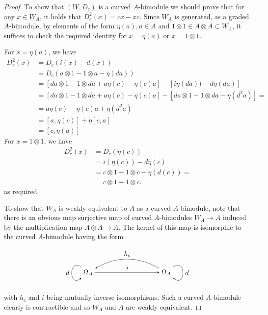 \documentclass[a4paper]{amsart}
\theoremstyle{plain}
\theoremstyle{definition}
\theoremstyle{remark}
\numberwithin{equation}{section}
\theoremstyle{plain}
\begin{document}
\begin{proof}
	To show that $(W,D_c)$ is a curved $A$-bimodule we should prove that for any $x\in W_A$, it holds that $D^2_c(x)=cx-xc$. Since $W_A$ is generated, as a graded $A$-bimodule, by elements of the form $\eta(a), a\in A$ and $1\otimes 1\in A\otimes A\subset W_A$, it suffices to check the required identity for $x=\eta(a)$ or $x=1\otimes 1$.
	
	For $x=\eta(a)$, we have
	\begin{align*}
		D^2_c(x)&=D_c(i(x)-d(x))\\&=D_c(a\otimes 1-1\otimes a-\eta(da))\\
		&=[da\otimes 1-1\otimes da+a\eta(c)-\eta(c)a]-[i\eta(da))-d\eta(da)]\\
		&=[da\otimes 1-1\otimes da+a\eta(c)-\eta(c)a]-[da\otimes 1-1\otimes da-\eta(d^2a)]=\\
		&=a\eta(c)-\eta(c)a+\eta(d^2a)\\
		&=[a,\eta(c)]+\eta[c,a]\\
		&=[c,\eta(a)]
	\end{align*}
	For $x=1\otimes 1$, we have
	\begin{align*}
		D^2_c(x)&=D_c(\eta(c))\\
		&=i(\eta(c))-d\eta(c)\\
		&=c\otimes 1-1\otimes c-\eta(d(c))=\\
		&=c\otimes 1-1\otimes c.
	\end{align*}
	as required.
	
	To show that $W_A$ is weakly equivalent to $A$ as a curved $A$-bimodule, note that there is an obvious map surjective map of curved $A$-bimodules $W_A\to A$ induced by the multiplication map $A\otimes A\to A$. The kernel of this map is isomorphic to the curved $A$-bimodule having the form
	
	\[
	\begin{tikzpicture}[>=stealth, baseline=(current bounding box.center)]
		\node (L) at (0,0) {$\Omega_A$};
		\node (R) at (4,0) {$\Omega_A$};
		
		\draw[->] (L) -- node[above] {$i$} (R);
		
		\draw[->] (R) to[out=150,in=30] node[above] {$h_c$}  (L);
		
		\draw[->]
		(L) .. controls +(-1,0.8) and +(-1,-0.8) ..
		node[left] {$d$} (L);
		
		\draw[->]
		(R) .. controls +(1,0.8) and +(1,-0.8) ..
		node[right] {$d$} (R);
	\end{tikzpicture}
	\]
	with $h_c$ and $i$ being mutually inverse isomorphisms. Such a curved $A$-bimodule clearly is contractible and so $W_A$ and $A$ are weakly equivalent.
\end{proof}
\end{document}
